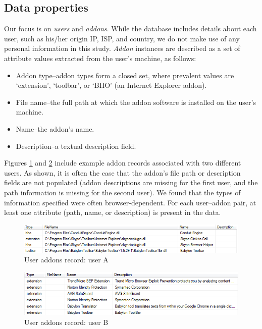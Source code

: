 \documentclass[ijoc,nonblindrev]{informs3} %
\numberwithin{equation}{subsection}
\begin{document}
\subsection{Data properties}

Our focus is on {\it users} and {\it addons}. While the database includes details about each user, such as his/her origin IP, ISP, and country, we do not make use of any personal information in this study. {\it Addon} instances are described as a set of attribute values extracted from the user's machine, as follows:
\begin{itemize}
\item Addon type--addon types form a closed set, where prevalent values are `extension', `toolbar', or `BHO' (an Internet Explorer addon).
\item File name--the full path at which the addon software is installed on the user's machine. 
\item Name--the addon's name. 
\item Description--a textual description field. 
\end{itemize}
Figures \ref{fig:db_addons_snapshot} and \ref{fig:db_addons_snapshot_desc} include example addon records associated with two different users. As shown, it is often the case that the addon's file path or description fields are not populated (addon descriptions are missing for the first user, and the path information is missing for the second user). We found that the types of information specified were often browser-dependent. For each user--addon pair, at least one attribute (path, name, or description) is present in the data.

\begin{figure}[t]
\centering
\begin{small}
\includegraphics[scale=.8,angle=0]{figures/db_addons_snapshot.png}
\end{small}
\caption{User addons record: user A}
\label{fig:db_addons_snapshot}
\end{figure}

\begin{figure}[t]
\centering
\begin{small}
\includegraphics[scale=.8,angle=0]{figures/db_addons_snapshot_desc.png}
\end{small}
\caption{User addons record: user B}
\label{fig:db_addons_snapshot_desc}
\end{figure}
\end{document}
